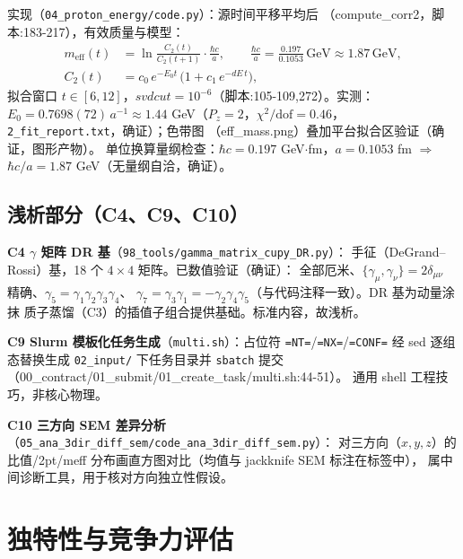 \documentclass[UTF8]{ctexart}
\begin{document}
实现（\texttt{\nolinkurl{04_proton_energy/code.py}}）：源时间平移平均后
（compute\_corr2，脚本:183-217），有效质量与模型：
\begin{align}
m_{\text{eff}}(t)&=\ln\frac{C_2(t)}{C_2(t+1)}\cdot\frac{\hbar c}{a},
\qquad \frac{\hbar c}{a}=\frac{0.197}{0.1053}\,\text{GeV}\approx1.87\,\text{GeV},
\label{eq:meff}\\
C_2(t)&=c_0\,e^{-E_0 t}\,\big(1+c_1\,e^{-dE\,t}\big),\label{eq:c2model}
\end{align}
拟合窗口 $t\in[6,12]$，$svdcut=10^{-6}$（脚本:105-109,272）。实测：
$E_0=0.7698(72)\,a^{-1}\approx1.44$ GeV（$P_z=2$，$\chi^2/\text{dof}=0.46$，
\texttt{\nolinkurl{2_fit_report.txt}}，\textcolor{accent}{确证}）；色带图
（eff\_mass.png）叠加平台拟合区验证（\textcolor{accent}{确证}，图形产物）。
单位换算量纲检查：$\hbar c=0.197$ GeV$\cdot$fm，$a=0.1053$ fm $\Rightarrow$
$\hbar c/a=1.87$ GeV（无量纲自洽，\textcolor{accent}{确证}）。



\subsection{浅析部分（C4、C9、C10）}

\textbf{C4 $\gamma$ 矩阵 DR 基}（\texttt{\nolinkurl{98_tools/gamma_matrix_cupy_DR.py}}）：
手征（DeGrand--Rossi）基，18 个 $4\times4$ 矩阵。已数值验证（\textcolor{accent}{确证}）：
全部厄米、$\{\gamma_\mu,\gamma_\nu\}=2\delta_{\mu\nu}$ 精确、$\gamma_5=\gamma_1\gamma_2\gamma_3\gamma_4$、
$\gamma_7=\gamma_3\gamma_1=-\gamma_2\gamma_4\gamma_5$（与代码注释一致）。DR 基为动量涂抹
质子蒸馏（C3）的插值子组合提供基础。标准内容，故浅析。

\textbf{C9 Slurm 模板化任务生成}（\texttt{\nolinkurl{multi.sh}}）：占位符
\texttt{=NT=}/\texttt{=NX=}/\texttt{=CONF=} 经 sed 逐组态替换生成
\texttt{02\_input/} 下任务目录并 \texttt{sbatch} 提交（00\_contract/01\_submit/01\_create\_task/multi.sh:44-51）。
通用 shell 工程技巧，非核心物理。

\textbf{C10 三方向 SEM 差异分析}（\texttt{\nolinkurl{05_ana_3dir_diff_sem/code_ana_3dir_diff_sem.py}}）：
对三方向（$x,y,z$）的比值/2pt/meff 分布画直方图对比（均值与 jackknife SEM 标注在标签中），
属中间诊断工具，用于核对方向独立性假设。

\section{独特性与竞争力评估}
\end{document}

